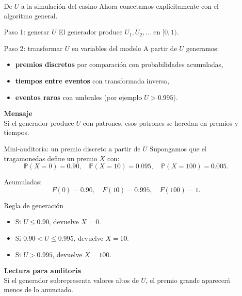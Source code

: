 \documentclass[aspectratio=1610, 9pt]{beamer}
\begin{document}
\begin{frame}{De $U$ a la simulación del casino}
    Ahora conectamos explícitamente con el algoritmo general.

    \vspace{0.25cm}
    \begin{block}{Paso 1: generar $U$}
    El generador produce $U_1,U_2,\dots$ en $[0,1)$.
    \end{block}

    \vspace{0.25cm}
    \begin{block}{Paso 2: transformar $U$ en variables del modelo}
    A partir de $U$ generamos:
    \begin{itemize}
        \item \textbf{premios discretos} por comparación con probabilidades acumuladas,
        \item \textbf{tiempos entre eventos} con transformada inversa,
        \item \textbf{eventos raros} con umbrales (por ejemplo $U>0.995$).
    \end{itemize}
    \end{block}

    \vspace{0.2cm}
    \textbf{Mensaje}\\
    Si el generador produce $U$ con patrones, esos patrones se heredan en premios y tiempos.
\end{frame}

\begin{frame}{Mini-auditoría: un premio discreto a partir de $U$}
    Supongamos que el tragamonedas define un premio $X$ con:
    \[
    \mathbb{P}(X=0)=0.90,\quad
    \mathbb{P}(X=10)=0.095,\quad
    \mathbb{P}(X=100)=0.005.
    \]

    \vspace{0.2cm}
    Acumuladas:
    \[
    F(0)=0.90,\quad F(10)=0.995,\quad F(100)=1.
    \]

    \vspace{0.25cm}
    \begin{block}{Regla de generación}
    \begin{itemize}
        \item Si $U\le 0.90$, devuelve $X=0$.
        \item Si $0.90<U\le 0.995$, devuelve $X=10$.
        \item Si $U>0.995$, devuelve $X=100$.
    \end{itemize}
    \end{block}

    \vspace{0.15cm}
    \textbf{Lectura para auditoría}\\
    Si el generador subrepresenta valores altos de $U$, el premio grande aparecerá menos de lo anunciado.
\end{frame}
\end{document}
